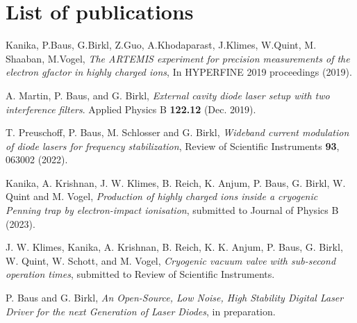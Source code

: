 \documentclass[12pt]{book}
\begin{document}
\chapter*{List of publications}

Kanika, P.Baus, G.Birkl, Z.Guo, A.Khodaparast, J.Klimes, W.Quint, M. Shaaban, M.Vogel, \textit{The ARTEMIS experiment for precision measurements of the electron gfactor in highly charged ions}, In HYPERFINE 2019 proceedings (2019).\par\vspace{12pt}

A. Martin, P. Baus, and G. Birkl, \textit{External cavity diode laser setup
with two interference filters}. Applied Physics B \textbf{122.12} (Dec. 2019).\par\vspace{12pt}

T. Preuschoff, P. Baus, M. Schlosser and G. Birkl, \textit{Wideband current modulation of diode lasers for frequency stabilization}, Review of Scientific Instruments \textbf{93}, 063002 (2022).\par\vspace{12pt}

Kanika, A. Krishnan, J. W. Klimes, B. Reich, K. Anjum, P. Baus, G. Birkl, W. Quint and M. Vogel, \textit{Production of highly charged ions inside a cryogenic
Penning trap by electron-impact ionisation}, submitted to Journal of Physics B (2023).\par\vspace{12pt}

J. W. Klimes, Kanika, A. Krishnan, B. Reich, K. K. Anjum, P. Baus, G. Birkl, W. Quint, W. Schott, and M. Vogel, \textit{Cryogenic vacuum valve with sub-second operation times}, submitted to Review of Scientific Instruments.\par\vspace{12pt}

P. Baus and G. Birkl, \textit{An Open-Source, Low Noise, High Stability Digital Laser Driver for the next
Generation of Laser Diodes}, in preparation.
\end{document}
